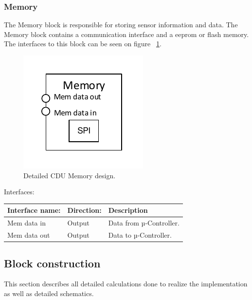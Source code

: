 \subsubsection{Memory}
The Memory block is responsible for storing sensor information and data. The Memory block contains a communication interface and a eeprom or flash memory.\\
The interfaces to this block can be seen on figure ~\ref{fig:CDUM}.\\
\begin{figure}[H]
	\centering
	\includegraphics[scale=1]{billeder/CDUM}
	\caption{Detailed CDU Memory design.}
	\label{fig:CDUM}
\end{figure}
Interfaces:
\begin{table}[H]
	\centering
	\begin{tabular}{|p{3cm} |p{3cm}| p{8cm}| }
		\hline
		Interface name: & Direction: 	& Description \\ \hline
		Mem data in		&Output & Data from µ-Controller. \\\hline 
		Mem data out	&Output & Data to µ-Controller. \\\hline  
	\end{tabular}
\end{table}

\subsection{Block construction}
This section describes all detailed calculations done to realize the implementation as well as detailed schematics.\\
